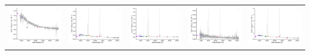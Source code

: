 \begin{center}
\begin{longtable}{l l l l l }
    \includegraphics[width=0.19\linewidth, clip]{Figs/Figs-sdss/spec-0332-52367-0306-SPLUS-n03s23-034002.pdf} & \includegraphics[width=0.19\linewidth, clip]{Figs/Figs-sdss/spec-0334-51993-0065-SPLUS-n03s28-019988.pdf} & \includegraphics[width=0.19\linewidth, clip]{Figs/Figs-sdss/spec-0334-51993-0365-SPLUS-n02s27-030519.pdf} & \includegraphics[width=0.19\linewidth, clip]{Figs/Figs-sdss/spec-0334-51993-0443-SPLUS-n02s28-028453.pdf} & \includegraphics[width=0.19\linewidth, clip]{Figs/Figs-sdss/spec-0371-52078-0576-STRIPE82-0128-050321.pdf} \\

\end{longtable}
\end{center}
